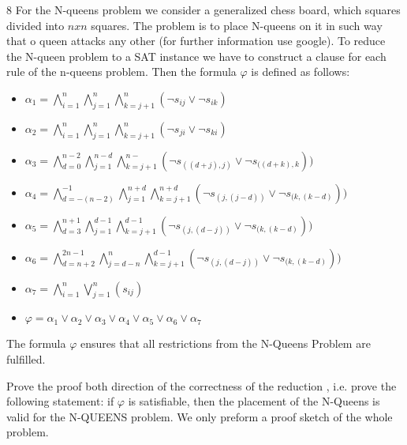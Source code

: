 \documentclass [11pt]{article}
\renewcommand{\phi}{\varphi}
\newcommand{\solution}[1]{\noindent {\bf Solution.}  #1}
\begin{document}
\solution{ 8}
For the  N-queens problem we consider  a generalized chess board, which squares divided into $n x n$  squares. The problem is to place N-queens on it in such way that o queen attacks any other (for further information use google).  To reduce the N-queen problem to a SAT instance we have to construct a clause for each rule of the n-queens problem. Then the formula $ \phi$ is defined as follows:

 \begin{center}
 \begin{itemize}
\item $ \alpha_1 = \bigwedge _{i=1} ^{n}   \bigwedge _{j=1} ^{n}   \bigwedge _{k=j+1} ^{n} (\neg s_{ij} \vee \neg s_{ik} ) $
\item $ \alpha_2 = \bigwedge _{i=1} ^{n}   \bigwedge _{j=1} ^{n}   \bigwedge _{k=j+1} ^{n} (\neg s_{ji} \vee \neg s_{ki} ) $
\item $ \alpha_3 = \bigwedge _{d=0} ^{n-2}   \bigwedge _{j=1} ^{n-d}   \bigwedge _{k=j+1} ^{n-} (\neg s_{((d+j),j)} \vee \neg s_{((d+k),k} )) $
\item $ \alpha_4 = \bigwedge _{d=-(n-2)} ^{-1}   \bigwedge _{j=1} ^{n+d}   \bigwedge _{k=j+1} ^{n+d} (\neg s_{(j,(j-d))} \vee \neg s_{(k,(k-d)} )) $
\item $ \alpha_5 = \bigwedge _{d=3} ^{n+1}   \bigwedge _{j=1} ^{d-1}   \bigwedge _{k=j+1} ^{d-1} (\neg s_{(j,(d-j))} \vee \neg s_{(k,(k-d)} )) $
\item $ \alpha_6 = \bigwedge _{d=n+2} ^{2n-1}   \bigwedge _{j=d-n} ^{n}   \bigwedge _{k=j+1} ^{d-1} (\neg s_{(j,(d-j))} \vee \neg s_{(k,(k-d)} )) $
\item $ \alpha_7 = \bigwedge _{i=1} ^{n}   \bigvee _{j=1} ^{n} (s_{ij}) $

  \bigskip
\item $\phi =  \alpha_1 \vee \alpha_2 \vee \alpha_3 \vee \alpha_4 \vee \alpha_5 \vee \alpha_6 \vee \alpha_7$ 

 \end{itemize}
\end{center}

The formula $\phi$ ensures that all restrictions from the N-Queens Problem are fulfilled.

\bigskip
Prove the proof both direction of the correctness of the reduction ,
i.e. prove the following statement: if $\phi$ is satisfiable, then the placement of the N-Queens is valid for the N-QUEENS problem. We only preform a proof sketch of the whole problem.
\end{document}
